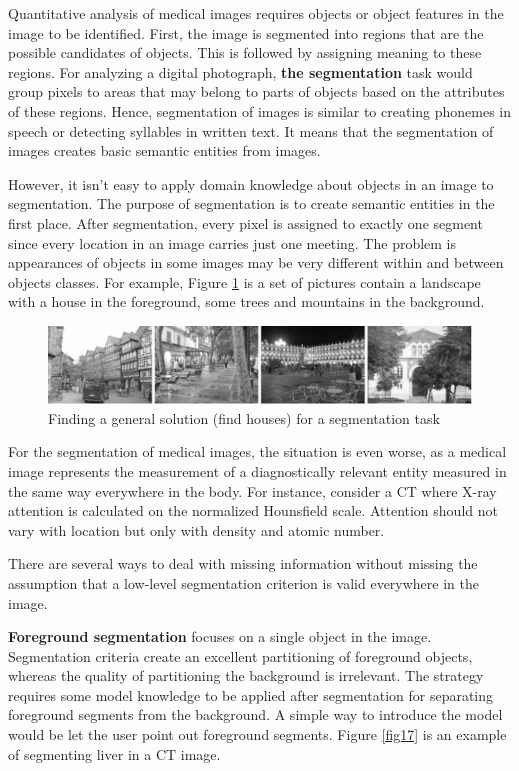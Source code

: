 Quantitative analysis of medical images requires objects or object features in the image to be identified. First, the image is segmented into regions that are the possible candidates of objects. This is followed by assigning meaning to these regions. For analyzing a digital photograph, \textbf{the segmentation} task would group pixels to areas that may belong to parts of objects based on the attributes of these regions. Hence, segmentation of images is similar to creating phonemes in speech or detecting syllables in written text. It means that the segmentation of images creates basic semantic entities from images.

However, it isn't easy to apply domain knowledge about objects in an image to segmentation. The purpose of segmentation is to create semantic entities in the first place. After segmentation, every pixel is assigned to exactly one segment since every location in an image carries just one meeting. The problem is appearances of objects in some images may be very different within and between objects classes. For example, Figure \ref{fig16} is a set of pictures contain a landscape with a house in the foreground, some trees and mountains in the background.

\begin{figure}[htbp]
	\centering \includegraphics[width=0.7\columnwidth]{./figures/Fig16.jpg}
	\caption{Finding a general solution (find  houses) for a segmentation task}
	\label{fig16}
\end{figure}

For the segmentation of medical images, the situation is even worse, as a medical image represents the measurement of a diagnostically relevant entity measured in the same way everywhere in the body. For instance, consider a CT where X-ray attention is calculated on the normalized Hounsfield scale. Attention should not vary with location but only with density and atomic number.


There are several ways to deal with missing information without missing the assumption that a low-level segmentation criterion is valid everywhere in the image.

\textbf{Foreground segmentation} focuses on a single object in the image. Segmentation criteria create an excellent partitioning of foreground objects, whereas the quality of partitioning the background is irrelevant. The strategy requires some model knowledge to be applied after segmentation for separating foreground segments from the background. A simple way to introduce the model would be let the user point out foreground segments. Figure \ref{fig17} is an example of segmenting liver in a CT image.

